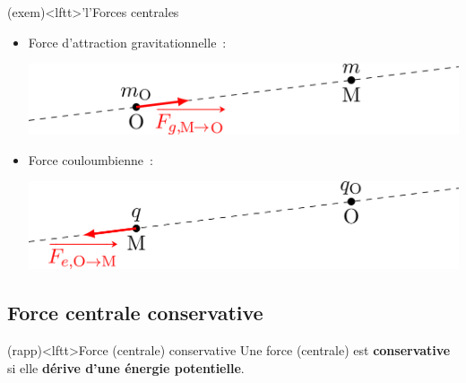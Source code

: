 \documentclass[../../main/main.tex]{subfiles}
\begin{document}
\begin{tcb*}(exem)<lftt>'l'{Forces centrales}
	\begin{itemize}
		\item Force d'attraction gravitationnelle~:
		      \smallbreak
		      \begin{minipage}{0.45\linewidth}
			      \psw{
				      \[\Ff_g = -\Gc \frac{m_\Or m}{r^2}\ur\]
			      }
		      \end{minipage}
		      \hfill
		      \begin{minipage}{0.45\linewidth}
			      \begin{center}
				      \includegraphics[scale=1]{intro_ex-grav}
			      \end{center}
		      \end{minipage}
		\item Force couloumbienne~: \smallbreak
		      \begin{minipage}{0.45\linewidth}
			      \psw{
				      \[\Ff_e = \frac{1}{4\pi\ep_0} \frac{qq_\Or}{r^2}\ur\]
			      }
		      \end{minipage}
		      \hfill
		      \begin{minipage}{0.45\linewidth}
			      \includegraphics[scale=1]{intro_ex-elec}
		      \end{minipage}
	\end{itemize}
  \vspace{-15pt}
\end{tcb*}

\subsection{Force centrale conservative}
\begin{tcb*}(rapp)<lftt>{Force (centrale) conservative}
	Une force (centrale) est \textbf{conservative} si elle \textbf{dérive d'une
		énergie potentielle}.
\end{tcb*}
\end{document}
